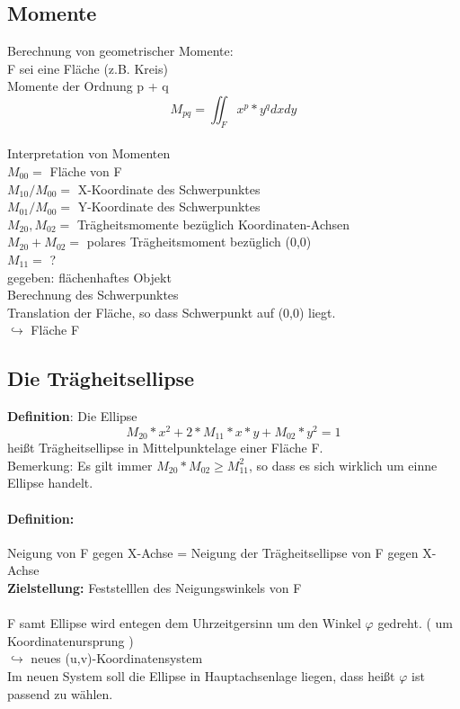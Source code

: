 \documentclass[a4paper,12pt]{scrreprt}
\begin{document}
 \subsection{Momente}
 
 Berechnung von geometrischer Momente:\\
 F sei eine Fläche (z.B. Kreis)\\
 Momente der Ordnung p + q\\
 $$ M_{pq} =  \iint_F  x^p * y^q dx dy $$ \\
 Interpretation von Momenten\\
 $M_{00} = $ Fläche von F\\
 $M_{10}/M_{00} = $ X-Koordinate des Schwerpunktes\\
 $M_{01}/M_{00} = $ Y-Koordinate des Schwerpunktes\\
 $M_{20},M_{02} = $ Trägheitsmomente bezüglich Koordinaten-Achsen\\
 $M_{20}+M_{02} = $ polares Trägheitsmoment bezüglich (0,0)\\
 $M_{11} = $ ? \\
 
 gegeben: flächenhaftes Objekt\\
 Berechnung des Schwerpunktes\\
 Translation der Fläche, so dass Schwerpunkt auf  (0,0) liegt.\\
 $ \hookrightarrow$ Fläche F
 
 \subsection{Die Trägheitsellipse}
 
 \textbf{Definition}: Die Ellipse\\
 $$M_{20} * x^2 + 2 * M_{11} * x  * y + M_{02} * y^2 = 1$$
  heißt Trägheitsellipse in Mittelpunktelage einer Fläche F.\\
  Bemerkung: Es gilt immer $ M_{20} * M_{02} \ge M_{11}^2 $, so dass es sich wirklich um einne Ellipse handelt.\\
  
  \paragraph{Definition:} Neigung von F gegen X-Achse = Neigung der Trägheitsellipse von F gegen X-Achse\\
  \textbf{Zielstellung:} Feststelllen des Neigungswinkels von F\\
  \\
  F samt Ellipse wird entegen dem Uhrzeitgersinn um den Winkel $\varphi$ gedreht. ( um Koordinatenursprung )\\
  $\hookrightarrow$ neues (u,v)-Koordinatensystem \\
  Im neuen System soll die Ellipse in Hauptachsenlage liegen, dass heißt $\varphi$ ist passend zu wählen.
  
\end{document}
